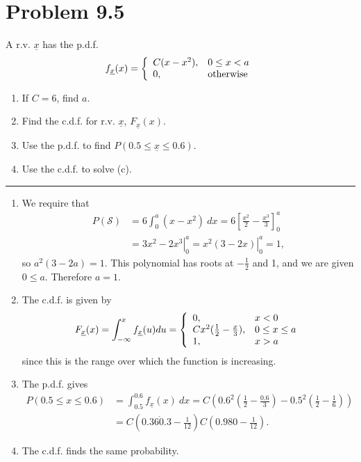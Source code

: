 \documentclass{article}
\newcommand{\horline}
           {\begin{center}
              \noindent\rule{8cm}{0.4pt}
            \end{center}}
\begin{document}
\section*{Problem 9.5}
A r.v. $\underline{x}$ has the p.d.f.
$$
f_{\underline{x}}(x) = \left\{ 
  \begin{array}{l l}
    C(x - x^2), & 0 \leq x < a \\
    0,          & \mbox{otherwise}
  \end{array} 
\right.
$$
\begin{enumerate}[label=(\roman*)]
  \item{If $C = 6$, find $a$.}
  \item{Find the c.d.f. for r.v. $\underline{x}$, $F_{\underline{x}}(x)$.}
  \item{Use the p.d.f. to find $P(0.5 \leq \underline{x} \leq 0.6)$.}
  \item{Use the c.d.f. to solve (c).}
\end{enumerate}
\horline
\begin{enumerate}[label=(\roman*)]
  \item{We require that
       \begin{align*}
       P(\mathcal{S}) &= 6\int_{0}^{a} (x - x^2) ~dx 
                       = 6\left[\frac{x^2}{2} - \frac{x^3}{3}\right]_0^a\\
                      &= \left.3x^2 - 2x^3\right|_0^a 
                       = \left.x^2(3 - 2x)\right|_0^a = 1,
       \end{align*}
       so $a^2(3 - 2a) = 1$. This polynomial has roots at $-\frac{1}{2}$ 
       and 1, and we are given $0 \leq a$. Therefore $a = 1$.
       }
  \item{The c.d.f. is given by 
       $$
       F_{\underline{x}}(x) = \int_{-\infty}^x f_{\underline{x}}(u) du
                            = \left\{\begin{array}{l l}
                              0,           & x < 0 \\
                              Cx^2(\frac{1}{2} - \frac{x}{3}), 
                                 & 0 \leq x \leq a \\
                              1,           & x > a
                              \end{array}\right.
       $$
       since this is the range over which the function is increasing.
       }
  \item{The p.d.f. gives
       \begin{align*}
       P(0.5 \leq x \leq 0.6) & = \int_{0.5}^{0.6} f_{\underline{x}}(x)~dx
         = C(0.6^2(\frac{1}{2} - \frac{0.6}{3})
          - 0.5^2(\frac{1}{2} - \frac{1}{6})) \\
        &= C(0.36 \dot 0.3 - \frac{1}{12}) C(0.980 - \frac{1}{12}).
       \end{align*}}
  \item{The c.d.f. finds the same probability.}
\end{enumerate}
\end{document}
